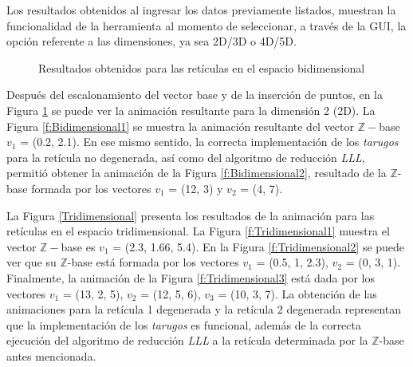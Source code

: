 \documentclass{llncs}
\begin{document}
Los resultados obtenidos al ingresar los datos previamente listados, muestran la funcionalidad de la herramienta al momento de seleccionar, a través de la GUI, la opción referente a las dimensiones, ya sea 2D/3D o 4D/5D.\\

\begin{figure}
	\centering
	\caption{Resultados obtenidos para las ret\'iculas en el espacio bidimensional}
	\label{f:Bidimensional}
\end{figure}


Después del escalonamiento del vector base y de la inserción de puntos, en la Figura \ref{f:Bidimensional} se puede ver la animación resultante para la dimensión 2 (2D). La Figura \ref{f:Bidimensional1} se muestra la animación resultante del vector $\mathbb{Z}-$base $v_{1}$ = (0.2, 2.1). En ese mismo sentido, la correcta implementaci\'on de los \textit{tarugos} para la ret\'icula no degenerada, así como del algoritmo de reducci\'on \textit{LLL}, permitió obtener la animación de la Figura \ref{f:Bidimensional2}, resultado de la $\mathbb{Z}$-base formada por los vectores $v_{1}$ = (12, 3)  y $v_{2}$ = (4, 7).

La Figura \ref{Tridimensional} presenta los resultados de la animación para las retículas en el espacio tridimensional. La Figura \ref{f:Tridimensional1} muestra el vector $\mathbb{Z}-$base es $v_1$ = (2.3, 1.66, 5.4). En la Figura \ref{f:Tridimensional2} se puede ver que su $\mathbb{Z}$-base est\'a formada por los vectores $v_1$ = (0.5, 1, 2.3), $v_2$ = (0, 3, 1). Finalmente, la animación de la Figura \ref{f:Tridimensional3} est\'a dada por los vectores  $v_1$ = (13, 2, 5), $v_2$ = (12, 5, 6), $v_3$ = (10, 3, 7). La obtención de las animaciones para la ret\'icula 1 degenerada y la ret\'icula 2 degenerada representan que la implementaci\'on de los \textit{tarugos} es funcional, además de la correcta ejecución del algoritmo de reducci\'on \textit{LLL} a la ret\'icula determinada por la $\mathbb{Z}$-base antes mencionada.
\end{document}
